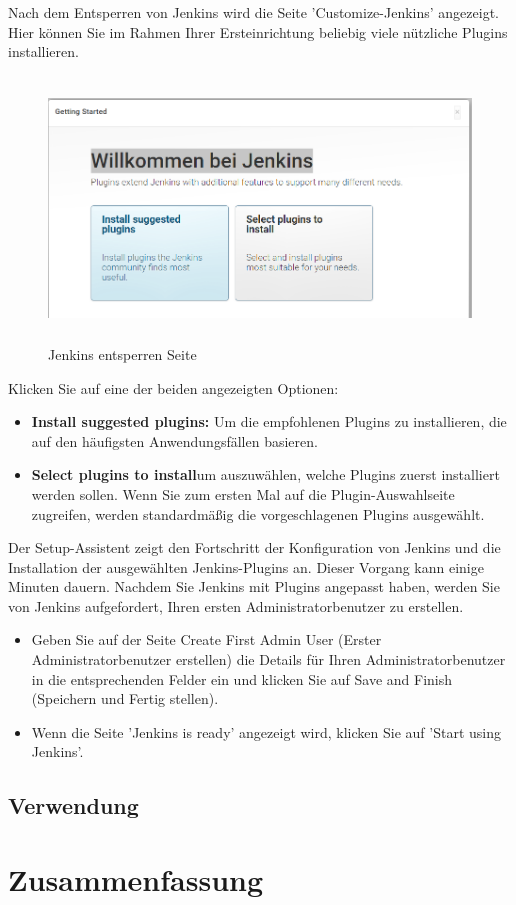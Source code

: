 \documentclass[a4paper,12pt,oneside]{book}
\begin{document}
Nach dem Entsperren von Jenkins wird die Seite 'Customize-Jenkins' angezeigt. Hier können Sie im Rahmen Ihrer Ersteinrichtung beliebig viele nützliche Plugins installieren.
\begin{figure}[h!]
	\begin{center}
		\includegraphics[width=17cm, height=7cm]{customize-jenkins.PNG}
		\caption{Jenkins entsperren Seite} 
		\label{Jenkins entsperren Seite} 
	\end{center}
\end{figure}
\newline
Klicken Sie auf eine der beiden angezeigten Optionen:
\begin{itemize}
	\item \textbf{Install suggested plugins: } Um die empfohlenen Plugins zu installieren, die auf den häufigsten Anwendungsfällen basieren.
	\item \textbf{Select plugins to install}um auszuwählen, welche Plugins zuerst installiert werden sollen. Wenn Sie zum ersten Mal auf die Plugin-Auswahlseite zugreifen, werden standardmäßig die vorgeschlagenen Plugins ausgewählt.
\end{itemize}
Der Setup-Assistent zeigt den Fortschritt der Konfiguration von Jenkins und die Installation der ausgewählten Jenkins-Plugins an. Dieser Vorgang kann einige Minuten dauern.
\newline
Nachdem Sie Jenkins mit Plugins angepasst haben, werden Sie von Jenkins aufgefordert, Ihren ersten Administratorbenutzer zu erstellen.
\begin{itemize}
	\item Geben Sie auf der Seite Create First Admin User (Erster Administratorbenutzer erstellen) die Details für Ihren Administratorbenutzer in die entsprechenden Felder ein und klicken Sie auf Save and Finish (Speichern und Fertig stellen).
	\item Wenn die Seite 'Jenkins is ready' angezeigt wird, klicken Sie auf 'Start using Jenkins'.
\end{itemize}
\section{Verwendung}
\chapter{Zusammenfassung}
\begin{thebibliography}{9}
\end{thebibliography}
\end{document}
